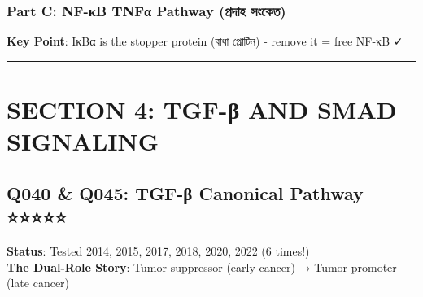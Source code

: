 \hypertarget{part-c-nf-ux3bab-tnfux3b1-pathway-ux9aaux9b0ux9a6ux9b9-ux9b8ux995ux9a4}{%
\subsection{\texorpdfstring{\textbf{Part C: NF-κB TNFα Pathway (প্রদাহ
সংকেত)}}{Part C: NF-κB TNFα Pathway (প্রদাহ সংকেত)}}\label{part-c-nf-ux3bab-tnfux3b1-pathway-ux9aaux9b0ux9a6ux9b9-ux9b8ux995ux9a4}}

\begin{Shaded}
\begin{Highlighting}[]
\end{Highlighting}
\end{Shaded}

\textbf{Key Point}: IκBα is the stopper protein (বাধা প্রোটিন) - remove
it = free NF-κB ✓

\begin{center}\rule{0.5\linewidth}{0.5pt}\end{center}

\hypertarget{section-4-tgf-ux3b2-and-smad-signaling}{%
\chapter{SECTION 4: TGF-β AND SMAD
SIGNALING}\label{section-4-tgf-ux3b2-and-smad-signaling}}

\hypertarget{q040-q045-tgf-ux3b2-canonical-pathway}{%
\section{Q040 \& Q045: TGF-β Canonical Pathway
⭐⭐⭐⭐⭐}\label{q040-q045-tgf-ux3b2-canonical-pathway}}

\textbf{Status}: Tested 2014, 2015, 2017, 2018, 2020, 2022 (6 times!)\\
\textbf{The Dual-Role Story}: Tumor suppressor (early cancer) → Tumor
promoter (late cancer)

